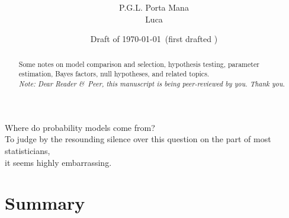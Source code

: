 \documentclass[\ifafour a4paper,12pt,\else a5paper,10pt,\fi%
onecolumn,oneside,article,%
british%
]{memoir}
\title{\propertitle%
}
\author{%
\hspace*{\stretch{1}}%
\parbox{0.5\linewidth}%
{\protect\centering\ifpublic P.G.L.  Porta Mana\\\else Luca  \fi%
\footnotesize\epost{\email{piero.mana}{ntnu.no}}}%
\hspace*{\stretch{1}}%
}
\date{Draft of \today\ (first drafted \firstdraft)}
\theoremstyle{remark}
\theoremstyle{innote}
\newcommand*{\citep}{\parencites}
\newcommand*{\amp}{\&}
\newcommand*{\asudedication}[1]{%
{\par\centering\textit{#1}\par}}
\renewcommand*{\|}{\mathpunct{|}}
\begin{document}
\captiondelim{\quad}\captionnamefont{\footnotesize}\captiontitlefont{\footnotesize}
\frenchspacing

\maketitle
\abstractrunin
\abslabeldelim{}
\renewcommand*{\abstractname}{}
\setlength{\absleftindent}{0pt}
\setlength{\absrightindent}{0pt}
\setlength{\abstitleskip}{-\absparindent}
\begin{abstract}%
  \noindent Some notes on model comparison and selection, hypothesis
  testing, parameter estimation, Bayes factors, null hypotheses, and
  related topics.
  \ifpublic\\\noindent\emph{\footnotesize Note: Dear Reader \amp\ Peer, this
    manuscript is being peer-reviewed by you. Thank you.}\fi
\end{abstract}

\frenchspacing


 \setlength{\epigraphwidth}{.5\columnwidth}
 \epigraphfontsize{\footnotesize}
 \setlength{\epigraphrule}{0pt}
 \epigraph{Where do probability models come from?\\ To judge by the resounding
  silence over this question on the part of most statisticians,\\ it seems
  highly embarrassing.}{\citep[p.~220]{dawid1982}}


\section{Summary}
\label{sec:summary}
\end{document}
